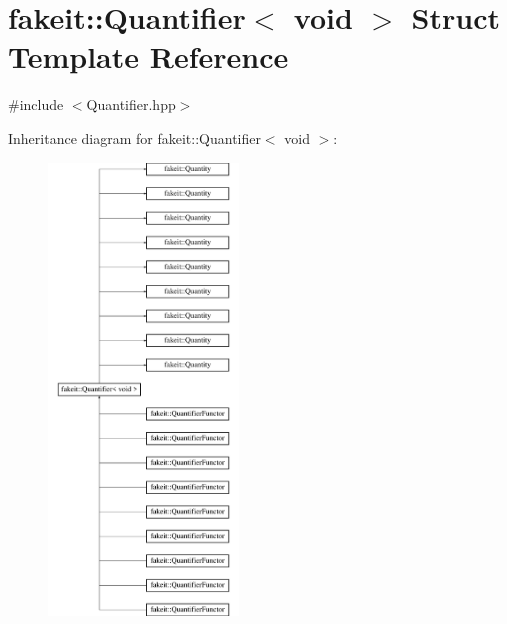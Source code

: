 \hypertarget{structfakeit_1_1Quantifier_3_01void_01_4}{}\section{fakeit\+::Quantifier$<$ void $>$ Struct Template Reference}
\label{structfakeit_1_1Quantifier_3_01void_01_4}


{\ttfamily \#include $<$Quantifier.\+hpp$>$}

Inheritance diagram for fakeit\+::Quantifier$<$ void $>$\+:\begin{figure}[H]
\begin{center}
\leavevmode
\includegraphics[height=12.000000cm]{structfakeit_1_1Quantifier_3_01void_01_4}
\end{center}
\end{figure}
